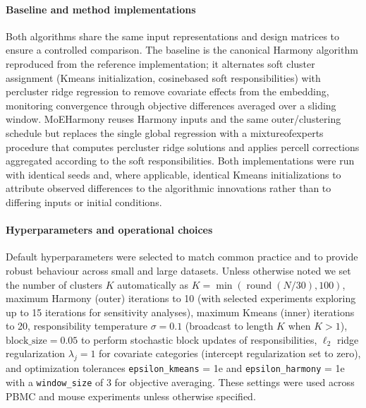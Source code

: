 \documentclass{article}
\begin{document}
\paragraph{Baseline and method implementations} Both algorithms share the same input representations and design matrices to ensure a controlled comparison. The baseline is the canonical Harmony algorithm reproduced from the reference implementation; it alternates soft cluster assignment (K\-means initialization, cosine\-based soft responsibilities) with per\-cluster ridge regression to remove covariate effects from the embedding, monitoring convergence through objective differences averaged over a sliding window. MoE\-Harmony reuses Harmony inputs and the same outer/clustering schedule but replaces the single global regression with a mixture\-of\-experts procedure that computes per\-cluster ridge solutions and applies per\-cell corrections aggregated according to the soft responsibilities. Both implementations were run with identical seeds and, where applicable, identical K\-means initializations to attribute observed differences to the algorithmic innovations rather than to differing inputs or initial conditions.

\paragraph{Hyperparameters and operational choices} Default hyperparameters were selected to match common practice and to provide robust behaviour across small and large datasets. Unless otherwise noted we set the number of clusters $K$ automatically as $K = \min(\operatorname{round}(N/30), 100)$, maximum Harmony (outer) iterations to 10 (with selected experiments exploring up to 15 iterations for sensitivity analyses), maximum K\-means (inner) iterations to 20, responsibility temperature $\sigma = 0.1$ (broadcast to length $K$ when $K > 1$), $\text{block\_size} = 0.05$ to perform stochastic block updates of responsibilities, $\ell_2$ ridge regularization $\lambda_j = 1$ for covariate categories (intercept regularization set to zero), and optimization tolerances \texttt{epsilon\_kmeans} = 1e and \texttt{epsilon\_harmony} = 1e with a \texttt{window\_size} of 3 for objective averaging. These settings were used across PBMC and mouse experiments unless otherwise specified.
\end{document}
